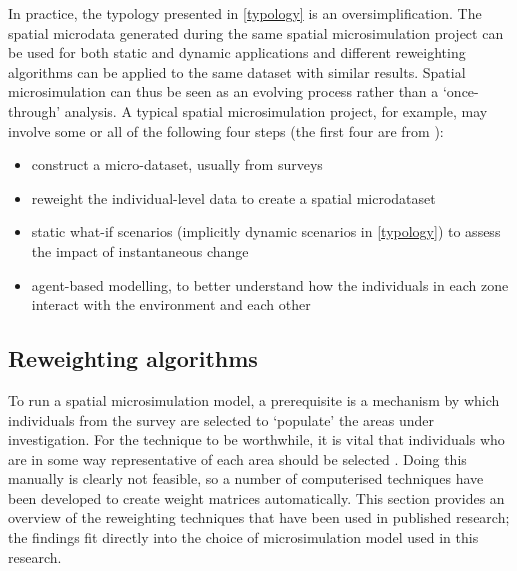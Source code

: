 In practice, the typology presented in \cref{typology} is an
oversimplification. The spatial microdata generated during the same spatial
microsimulation project can be used for both static and dynamic applications and
different reweighting algorithms can be applied to the same dataset with
similar results. Spatial microsimulation can thus be seen as an evolving
process rather than a `once-through' analysis. A typical spatial microsimulation
project, for example, may involve some or all of the following four steps
(the first four are from \citealp{ballas2003microsimulation-30-years}):
\begin{itemize}
 \item construct a micro-dataset, usually from surveys
 \item reweight the individual-level data to create a spatial microdataset
 \item static what-if scenarios (implicitly dynamic scenarios in
\cref{typology}) to assess the impact of instantaneous change
 \item agent-based modelling, to better understand how the individuals in each
zone interact with the environment and each other
\end{itemize}

% 

\subsection{Reweighting algorithms} %
\label{sreweight}
To run a spatial microsimulation model, a prerequisite is a mechanism by
which individuals from the survey are selected to `populate' the areas under
investigation. For the technique to be worthwhile, it is vital that individuals
who are in some way representative of each area should be selected
\citep{Ballas2005}⁠. Doing this manually is clearly not feasible, so a number
of computerised techniques have been developed to create weight matrices
automatically. This section provides an overview of the reweighting techniques
that have been used in published research; the findings fit directly into the
choice of microsimulation model used in this research. %

